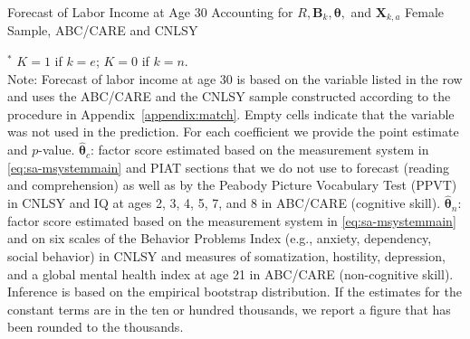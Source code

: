 \begin{table}
\begin{threeparttable}
\caption{Forecast of Labor Income at Age 30 Accounting for $R, \bm{B}_k, \bm{\theta},$ and $\bm{X}_{k,a}$ Female Sample, ABC/CARE and CNLSY}
\label{table:inv0}
\centering
\scriptsize

\begin{tablenotes}
\footnotesize
\item $^\ast$ $K=1$ if $k=e$; $K=0$ if $k=n$.\\
Note: Forecast of labor income at age 30 is based on the variable listed in the row and uses the ABC/CARE and the CNLSY sample constructed according to the procedure in Appendix~\ref{appendix:match}. Empty cells indicate that the variable was not used in the prediction. For each coefficient we provide the point estimate and $p$-value. $\hat{\bm{\theta}}_{c}$: factor score estimated based on the measurement system in \eqref{eq:sa-msystemmain} and PIAT sections that we do not use to forecast (reading and comprehension) as well as by the Peabody Picture Vocabulary Test (PPVT) in CNLSY and IQ at ages 2, 3, 4, 5, 7, and 8 in ABC/CARE (cognitive skill). $\hat{\bm{\theta}}_{n}$: factor score estimated based on the measurement system in \eqref{eq:sa-msystemmain} and on six scales of the Behavior Problems Index (e.g., anxiety, dependency, social behavior) in CNLSY and measures of somatization, hostility, depression, and a global mental health index at age 21 in ABC/CARE (non-cognitive skill). Inference is based on the empirical bootstrap distribution. If the estimates for the constant terms are in the ten or hundred thousands, we report a figure that has been rounded to the thousands.
\end{tablenotes}
\end{threeparttable}
\end{table}

